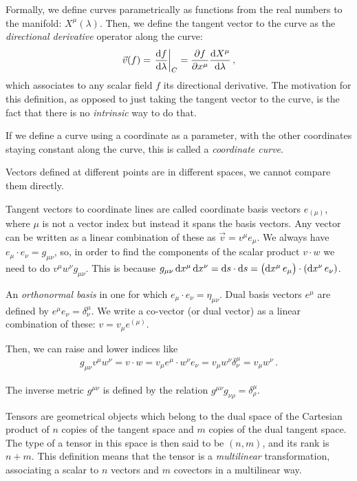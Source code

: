 \documentclass[main.tex]{subfiles}
\begin{document}
Formally, we define curves parametrically as functions from the real numbers to the manifold: \(X^{\mu }(\lambda )\). 
Then, we define the tangent vector to the curve as the \emph{directional derivative} operator along the curve: 
%
\begin{align}
\vec{v} (f) = \eval{\dv{f}{\lambda }}_{C} = \pdv{f}{x^{\mu }} \dv{X^{\mu }}{\lambda }
\,,
\end{align}
%
which associates to any scalar field \(f\) its directional derivative. 
The motivation for this definition, as opposed to just taking the tangent vector to the curve, is the fact that there is no \emph{intrinsic} way to do that. 

If we define a curve using a coordinate as a parameter, with the other coordinates staying constant along the curve, this is called a \emph{coordinate curve}. 

Vectors defined at different points are in different spaces, we cannot compare them directly. 

Tangent vectors to coordinate lines are called coordinate basis vectors \(e_{(\mu )}\), where \(\mu \) is not a vector index but instead it spans the basis vectors.
Any vector can be written as a linear combination of these as \(\vec{v} = v^{\mu } e_{\mu }\).
We always have \(e_{\mu } \cdot e_{\nu } = g_{\mu \nu }\), so, in order to find the components of the scalar product \(v \cdot w\) we need to do \(v^{\mu } w^{\nu } g_{\mu \nu  }\). 
This is because \(g_{\mu \nu } \dd{x^{\mu } } \dd{x^{\nu }} = \dd{s} \cdot \dd{s} = \qty(\dd{x^{\mu }} e_{\mu }) \cdot \qty(\dd{x^{\nu }} e_{\nu })\). 

An \emph{orthonormal basis} in one for which \(e_{\mu } \cdot e_{\nu } = \eta_{\mu \nu }\). 
Dual basis vectors \(e^{\mu }\) are defined by \(e^{\mu } e_{\nu } = \delta^{\mu }_{\nu }\). 
We write a co-vector (or dual vector) as a linear combination of these: \(v = v_{\mu } e^{(\mu)}\). 

Then, we can raise and lower indices like 
%
\begin{align}
g_{\mu \nu } v^{\mu } w^{\nu } = v \cdot w = v_{\mu } e^{\mu } \cdot w^{\nu } e_{\nu } = v_{\mu } w^{\nu } \delta^{\mu }_{\nu } = v_{\mu } w^{\nu }
\,.
\end{align}

The inverse metric \(g^{\mu \nu }\) is defined by the relation \(g^{\mu \nu } g_{\nu \rho } = \delta^{\mu }_{\rho }\). 

Tensors are geometrical objects which belong to the dual space of the Cartesian product of \(n\) copies of the tangent space and \(m\) copies of the dual tangent space.
The type of a tensor in this space is then said to be \((n, m)\), and its rank is \(n+m\). 
This definition means that the tensor is a \emph{multilinear} transformation, associating a scalar to \(n\) vectors and \(m\) covectors in a multilinear way. 
\end{document}
